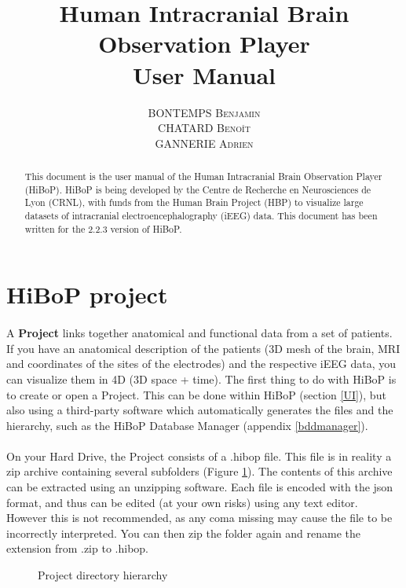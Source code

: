 \documentclass[a4paper]{article}
\title{Human Intracranial Brain Observation Player \\ User Manual}
\author{\textsc{BONTEMPS Benjamin} \\ \textsc{CHATARD Benoît} \\ \textsc{GANNERIE Adrien}}
\begin{document}
\maketitle
\begin{abstract}
This document is the user manual of the Human Intracranial Brain Observation Player (HiBoP). HiBoP is being developed by the Centre de Recherche en Neurosciences de Lyon (CRNL), with funds from the Human Brain Project (HBP) to visualize large datasets of intracranial electroencephalography (iEEG) data. This document has been written for the 2.2.3 version of HiBoP.
\end{abstract}
\tableofcontents
\section{HiBoP project} \label{data}
\paragraph{} A \textbf{Project} links together anatomical and functional data from a set of patients. If you have an anatomical description of the patients (3D mesh of the brain, MRI and coordinates of the sites of the electrodes) and the respective iEEG data, you can visualize them in 4D (3D space + time). The first thing to do with HiBoP is to create or open a Project. This can be done within HiBoP (section \ref{UI}), but also using a third-party software which automatically generates the files and the hierarchy, such as the HiBoP Database Manager (appendix \ref{bddmanager}).
\paragraph{} On your Hard Drive, the Project consists of a .hibop file. This file is in reality a zip archive containing several subfolders (Figure \ref{projectDirectory}). The contents of this archive can be extracted using an unzipping software. Each file is encoded with the json format, and thus can be edited (at your own risks) using any text editor. However this is not recommended, as any coma missing may cause the file to be incorrectly interpreted. You can then zip the folder again and rename the extension from .zip to .hibop.
\begin{figure}[H]
\caption{\label{projectDirectory}Project directory hierarchy}
\end{figure}
\end{document}
